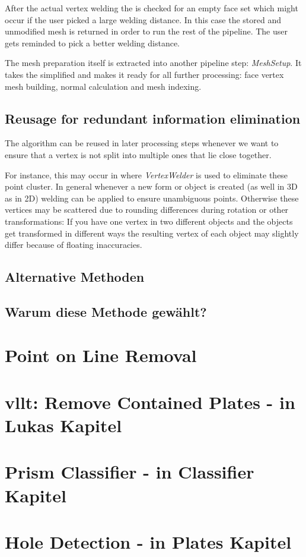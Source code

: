 \documentclass[../ClassicThesis.tex]{subfiles}
\begin{document}
After the actual vertex welding the {\threedmodel} is checked for an empty face set which might occur if the user picked a large welding distance. In this case the stored and unmodified mesh is returned in order to run the rest of the pipeline. The user gets reminded to pick a better welding distance.

The mesh preparation itself is extracted into another pipeline step: \emph{MeshSetup}. It takes the simplified {\threedmodel} and makes it ready for all further processing: face vertex mesh building, normal calculation and mesh indexing.


    
\subsection{Reusage for redundant information elimination}

The algorithm can be reused in later processing steps whenever we want to ensure that a vertex is not split into multiple ones that lie close together. 

For instance, this may occur in  where \emph{VertexWelder} is used to eliminate these point cluster. In general whenever a new form or object is created (as well in 3D as in 2D) welding can be applied to ensure unambiguous points. Otherwise these vertices may be scattered due to rounding differences during rotation or other transformations: If you have one vertex in two different objects and the objects get transformed in different ways the resulting vertex of each object may slightly differ because of floating inaccuracies.



\subsection{Alternative Methoden}

\subsection{Warum diese Methode gewählt?}

\section{Point on Line Removal}

\section{vllt: Remove Contained Plates - in Lukas Kapitel}

\section{Prism Classifier - in Classifier Kapitel}

\section{Hole Detection - in Plates Kapitel}

\end{document}
